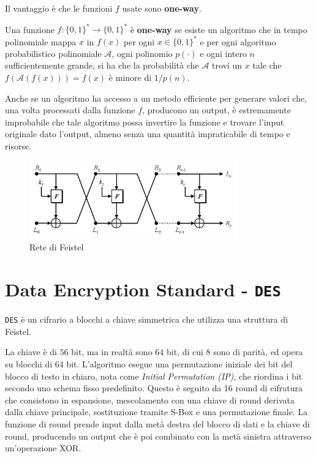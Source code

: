 Il vantaggio è che le funzioni $f$ usate sono \textbf{one-way}.
\begin{tcolorbox}[title=One-way function]
    Una funzione $f: \{0,1\}^* \rightarrow \{0,1\}^*$ è \textbf{one-way} se esiste un algoritmo 
    che in tempo polinomiale mappa $x$ in $f(x)$ per ogni $x \in \{0,1\}^*$ e per ogni algoritmo 
    probabilistico polinomiale $\mathcal{A}$, ogni polinomio $p(\cdot)$
    e ogni intero $n$ sufficientemente grande, si ha che la probabilità che $\mathcal{A}$
    trovi un $x$ tale che $f(\mathcal{A}(f(x))) = f(x)$ è minore di $1/p(n)$.
\end{tcolorbox}
Anche se un algoritmo ha accesso a un metodo efficiente per generare valori che, una volta
processati dalla funzione $f$, producono un output, è estremamente improbabile che tale algoritmo 
possa invertire la funzione e trovare l'input originale dato l'output, almeno senza una 
quantità impraticabile di tempo e risorse.
\begin{figure}[H]
    \centering
    \includegraphics[width=0.8\textwidth]{img/feistel.png}
    \caption{Rete di Feistel}
\end{figure}
\section{Data Encryption Standard - \texttt{DES}}
\texttt{DES} è un cifrario a blocchi a chiave simmetrica che utilizza una struttura di Feistel.

La chiave è di $56$ bit, ma in realtà sono $64$ bit, di cui $8$ sono di parità, ed 
opera su blocchi di $64$ bit. 
L'algoritmo esegue una permutazione iniziale dei bit del blocco di testo in chiaro,
nota come \textit{Initial Permutation (IP)}, che riordina i bit secondo uno schema
fisso predefinito. Questo è seguito da 16 round di cifratura che consistono in espansione,
mescolamento con una chiave di round derivata dalla chiave principale, sostituzione tramite S-Box
e una permutazione finale. La funzione di round prende input dalla metà destra del blocco di dati
e la chiave di round, producendo un output che è poi combinato con la metà sinistra attraverso
un'operazione XOR.

